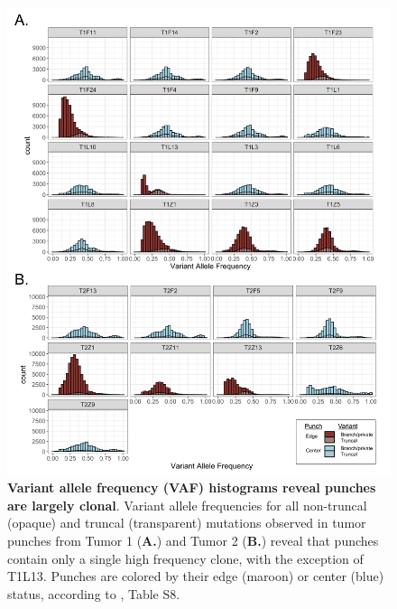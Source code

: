 \documentclass[12pt]{elife_based}
\begin{document}
\begin{figure}
\includegraphics[width=\textwidth]{figures/figS9.pdf}
\caption{\textbf{Variant allele frequency (VAF) histograms reveal punches are largely clonal}. Variant allele frequencies for all non-truncal (opaque) and truncal (transparent) mutations observed in tumor punches from Tumor 1 (\textbf{A.}) and Tumor 2 (\textbf{B.}) reveal that punches contain only a single high frequency clone, with the exception of T1L13. Punches are colored by their edge (maroon) or center (blue) status, according to \cite{Li2022}, Table S8.}
\label{figsupp:sf5-5}
\end{figure} 
\end{document}
